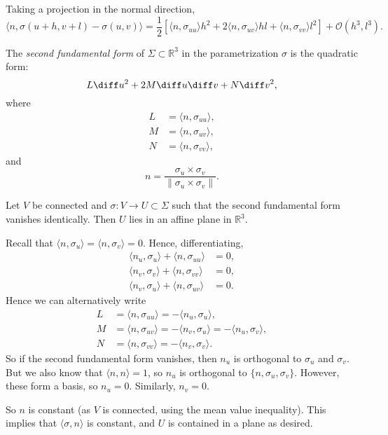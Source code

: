 \documentclass[12pt]{article}
\begin{document}
Taking a projection in the normal direction,
\[
	\langle n, \sigma(u+h,v+l)-\sigma(u,v)\rangle = \frac{1}{2}[\langle n, \sigma_{uu} \rangle h^2 + 2 \langle n, \sigma_{uv} \rangle hl + \langle n, \sigma_{vv} \rangle l^2] + \mathcal{O}(h^3, l^3)
.\]
\begin{definition}
	The \emph{second fundamental form} of $\Sigma \subset \mathbb{R}^3$ in the parametrization $\sigma$ is the quadratic form:
	\[
	L \diff u^2 + 2 M \diff u \diff v + N \diff v^2
	,\]
	where
	\begin{align*}
		L &= \langle n, \sigma_{uu}\rangle, \\
		M &= \langle n, \sigma_{uv} \rangle, \\
		N &= \langle n, \sigma_{vv} \rangle,
	\end{align*}
	and
	\[
		n = \frac{\sigma_u \times \sigma_v}{\| \sigma_u \times \sigma_v\|}
	.\]
\end{definition}

\begin{lemma}
	Let $V$ be connected and $\sigma : V \to U \subset \Sigma$ such that the second fundamental form vanishes identically. Then $U$ lies in an affine plane in $\mathbb{R}^3$.
\end{lemma}

\begin{proofbox}
	Recall that $\langle n, \sigma_u \rangle = \langle n, \sigma_v \rangle = 0$. Hence, differentiating,
	\begin{align*}
		\langle n_u, \sigma_u \rangle + \langle n, \sigma_{uu} \rangle &= 0, \\
		\langle n_v, \sigma_v \rangle + \langle n, \sigma_{vv} \rangle &= 0, \\
		\langle n_v, \sigma_u \rangle + \langle n, \sigma_{uv} \rangle &= 0.
	\end{align*}
	Hence we can alternatively write
	\begin{align*}
		L &= \langle n, \sigma_{uu} \rangle = - \langle n_u, \sigma_u \rangle, \\
		M &= \langle n, \sigma_{uv} \rangle = - \langle n_v, \sigma_u \rangle = - \langle n_u, \sigma_v \rangle, \\
		N &= \langle n, \sigma_{vv} \rangle = - \langle n_v, \sigma_v \rangle.
	\end{align*}
	So if the second fundamental form vanishes, then $n_u$ is orthogonal to $\sigma_u$ and $\sigma_v$. But we also know that $\langle n, n \rangle = 1$, so $n_u$ is orthogonal to $\{n, \sigma_u, \sigma_v\}$. However, these form a basis, so $n_u = 0$. Similarly, $n_v = 0$.

	So $n$ is constant (as $V$ is connected, using the mean value inequality). This implies that $\langle \sigma, n \rangle$ is constant, and $U$ is contained in a plane as desired.
\end{proofbox}
\end{document}
